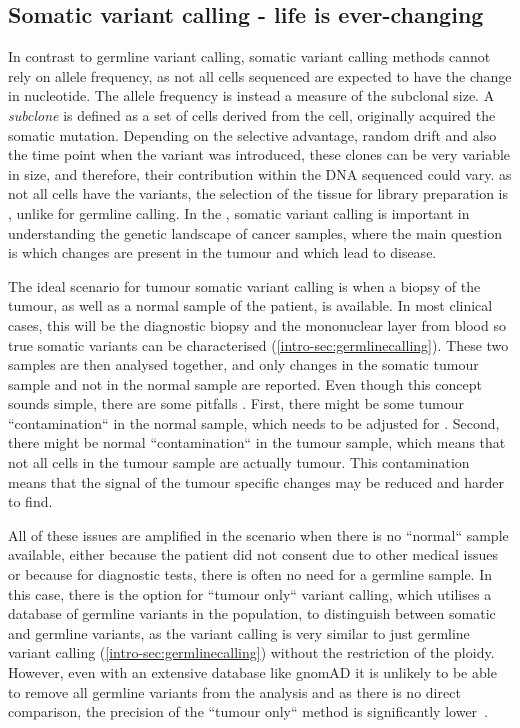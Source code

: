 \subsection[Somatic]{Somatic variant calling - life is ever-changing}
\label{intro-sec:somaticcalling}
In contrast to germline variant calling, somatic variant calling methods cannot rely on allele frequency, as not all cells sequenced are expected to have the  change in nucleotide. The allele frequency is instead a measure of the subclonal size. A \textit{subclone} is defined as a set of cells  derived from the cell,  originally acquired the somatic mutation. Depending on the selective advantage, random drift and also the time point when the variant was introduced, these clones can be very variable in size, and therefore, their contribution within the DNA sequenced could vary.
 as not all cells have the variants, the selection of the tissue for library preparation is , unlike for germline calling. 
In the , somatic variant calling is important in understanding the genetic landscape of cancer samples, where the main question is which changes are present in the tumour and which lead to disease.

The ideal scenario for tumour somatic variant calling is when a biopsy of the tumour, as well as a normal sample of the patient, is available. In most clinical cases, this will be the diagnostic biopsy and the mononuclear layer from blood\remove{,} so  true somatic variants can be characterised (\autoref{intro-sec:germlinecalling}). 
These two samples are then analysed together, and only changes  in the somatic tumour sample and not in the normal sample are reported. Even though this concept sounds simple, there are some pitfalls \cite{GATKTeam2021a}. First, there might be some tumour ``contamination`` in the normal sample, which needs to be adjusted for \cite{Kim2018,TaylorWeiner2018}. Second, there might be normal ``contamination`` in the tumour sample, which means that not all cells in the tumour sample are actually tumour. This contamination means that the signal of the tumour specific changes may be reduced and harder to find.

All of these issues are amplified in the scenario when there is no ``normal`` sample available, either because the patient did not consent due to other medical issues or because for diagnostic tests, there is often no need for a germline sample. In this case, there is the option for ``tumour only`` variant calling, which utilises a database of germline variants in the population, to distinguish between somatic and germline variants, as the variant calling is very similar to just germline variant calling (\autoref{intro-sec:germlinecalling}) without the restriction of the ploidy. However, even with an extensive database like gnomAD \cite{Karczewski2020} it is unlikely to be able to remove all germline variants from the analysis and as there is no direct comparison, the precision of the ``tumour only`` method is significantly lower~\cite{Karimnezhad2020}.

